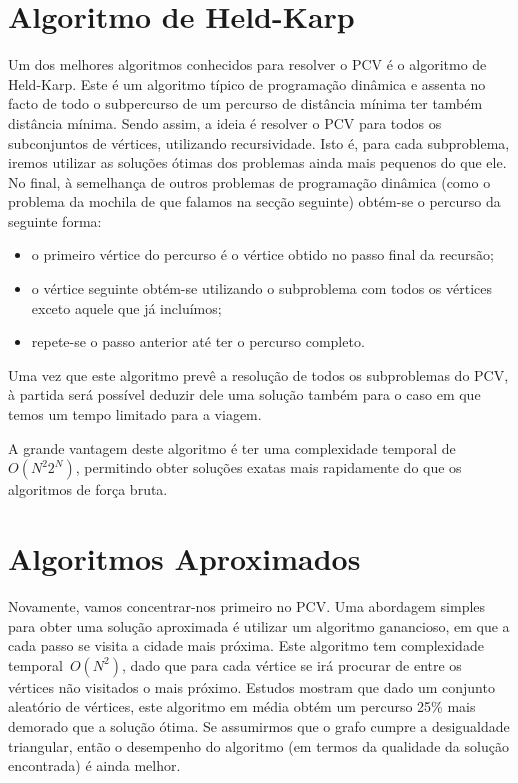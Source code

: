 \documentclass[12pt,a4paper,reqno]{report}
\numberwithin{figure}{section}
\numberwithin{equation}{section}
\begin{document}
\section{Algoritmo de Held-Karp}

Um dos melhores algoritmos conhecidos para resolver o PCV é o algoritmo de Held-Karp. Este é um algoritmo típico de programação dinâmica e assenta no facto de todo o subpercurso de um percurso de distância mínima ter também distância mínima. Sendo assim, a ideia é resolver o PCV para todos os subconjuntos de vértices, utilizando recursividade. Isto é, para cada subproblema, iremos utilizar as soluções ótimas dos problemas ainda mais pequenos do que ele. No final, à semelhança de outros problemas de programação dinâmica (como o problema da mochila de que falamos na secção seguinte) obtém-se o percurso da seguinte forma:
\begin{itemize}
	\item o primeiro vértice do percurso é o vértice obtido no passo final da recursão;
	\item o vértice seguinte obtém-se utilizando o subproblema com todos os vértices exceto aquele que já incluímos;
	\item repete-se o passo anterior até ter o percurso completo.
\end{itemize}

Uma vez que este algoritmo prevê a resolução de todos os subproblemas do PCV, à partida será possível deduzir dele uma solução também para o caso em que temos um tempo limitado para a viagem.

A grande vantagem deste algoritmo é ter uma complexidade temporal de~$O(N^2 2^N)$, permitindo obter soluções exatas mais rapidamente do que os algoritmos de força bruta.

\section{Algoritmos Aproximados}

Novamente, vamos concentrar-nos primeiro no PCV. Uma abordagem simples para obter uma solução aproximada é utilizar um algoritmo ganancioso, em que a cada passo se visita a cidade mais próxima. Este algoritmo tem complexidade temporal~$O(N^2)$, dado que para cada vértice se irá procurar de entre os vértices não visitados o mais próximo. Estudos mostram que dado um conjunto aleatório de vértices, este algoritmo em média obtém um percurso 25\% mais demorado que a solução ótima. Se assumirmos que o grafo cumpre a desigualdade triangular, então o desempenho do algoritmo (em termos da qualidade da solução encontrada) é ainda melhor.
\end{document}
